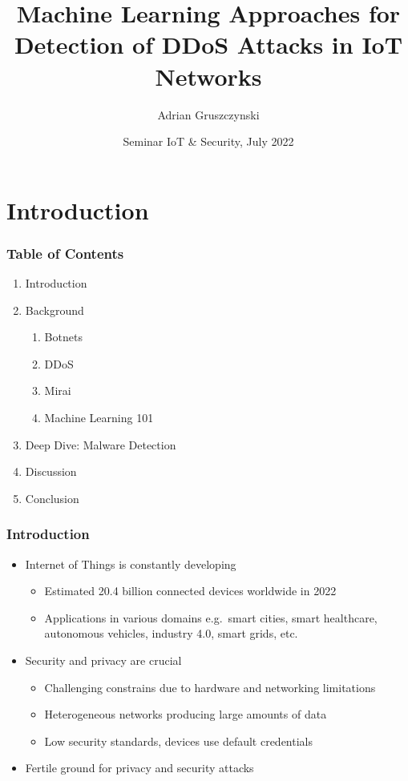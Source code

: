 \documentclass[10pt, presentation]{beamer}
\title[Machine Learning for DDoS Detection] %
{Machine Learning Approaches for Detection of DDoS Attacks in IoT Networks}
\subtitle{}
\author[Adrian Gruszczynski] %
{Adrian Gruszczynski}
\institute[Freie Universität Berlin] %
{
    Institute of Computer Science\\
    Freie Universität Berlin
}
\date[2022] %
{Seminar IoT \& Security, July 2022}
\begin{document}
    \frame{\titlepage}


    \section{Introduction}
    \begin{frame}
        \frametitle{Table of Contents}
        \begin{enumerate}
            \item Introduction
            \item Background
            \begin{enumerate}
                \item Botnets
                \item DDoS
                \item Mirai
                \item Machine Learning 101
            \end{enumerate}
            \item Deep Dive: Malware Detection
            \item Discussion
            \item Conclusion
        \end{enumerate}
    \end{frame}

    \begin{frame}
        \frametitle{Introduction}
        \begin{itemize}
            \item Internet of Things is constantly developing
            \begin{itemize}
                \item Estimated 20.4 billion connected devices worldwide in 2022\ \cite{WEBSITE:1}
                \item Applications in various domains e.g.\ smart cities, smart healthcare, autonomous vehicles, industry 4.0, smart grids, etc.
            \end{itemize}
            \item Security and privacy are crucial
            \begin{itemize}
                \item Challenging constrains due to hardware and networking limitations
                \item Heterogeneous networks producing large amounts of data
                \item Low security standards, devices use default credentials \cite{article:8}
            \end{itemize}
            \item Fertile ground for privacy and security attacks
        \end{itemize}
    \end{frame}
\end{document}
